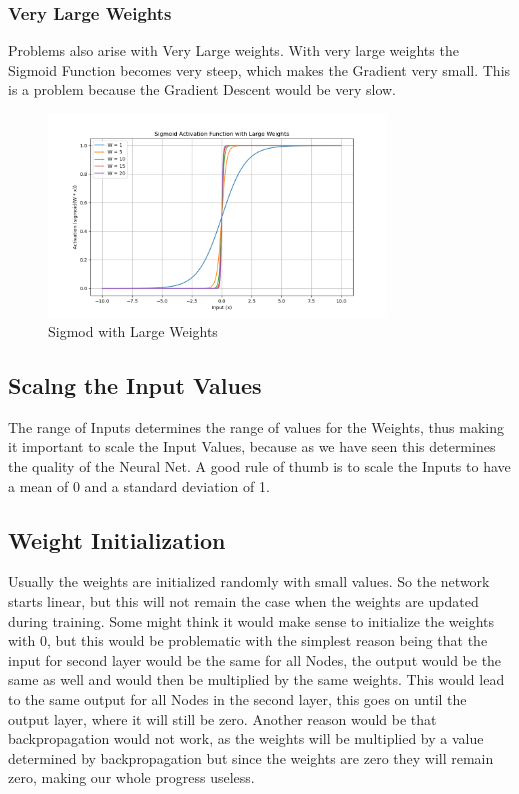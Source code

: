 \documentclass[a4paper]{article}
\begin{document}
\subsubsection{Very Large Weights}
Problems also arise with Very Large weights. With very large weights the Sigmoid Function becomes very steep, which makes the Gradient very small. This is a problem because the Gradient Descent would be very slow.

\begin{figure}[h]
    \centering
    \includegraphics[width=0.8\textwidth]{images/sigmoid_large_weights.png}
    \caption{Sigmod with Large Weights}
    \label{fig:Sigmod Large weights}
\end{figure}

\subsection{Scalng the Input Values}
The range of Inputs determines the range of values for the Weights, thus making it important to scale the Input Values, because as we have seen this determines the quality of the Neural Net. A good rule of thumb is to scale the Inputs to have a mean of 0 and a standard deviation of 1. 
\subsection{Weight Initialization}
Usually the weights are initialized randomly with small values. So the network starts linear, but this will not remain the case when the weights are updated during training. Some might think it would make sense to initialize the weights with 0, but this would be problematic with the simplest reason being that 
the input for second layer would be the same for all Nodes, the output would be the same as well and would then be multiplied by the same weights. This would lead to the same output for all Nodes in the second layer, this goes on until the output layer, where it will still be zero.  Another reason would be that backpropagation would not
work, as the weights will be multiplied by a value determined by backpropagation but since the weights are zero they will remain zero, making our whole progress useless. 
\end{document}

